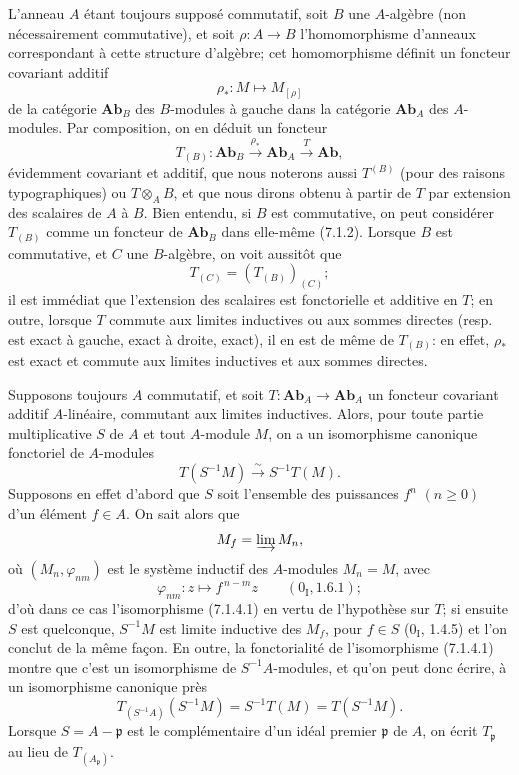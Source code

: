 \begin{env}[7.1.3]
L'anneau $A$ étant toujours supposé commutatif, soit $B$ une $A$-algèbre (non
nécessairement commutative), et soit $\rho:A\to B$ l'homomorphisme d'anneaux
correspondant à cette structure d'algèbre; cet homomorphisme définit un
foncteur covariant
additif
\[
  \rho_*:M\longmapsto M_{[\rho]}
\]
de la catégorie $\mathbf{Ab}_B$ des $B$-modules à gauche dans la catégorie
$\mathbf{Ab}_A$ des $A$-modules. Par composition, on en déduit un foncteur
\[
  T_{(B)}:
  \mathbf{Ab}_B
  \xrightarrow{\rho_*}
  \mathbf{Ab}_A
  \xrightarrow{T}
  \mathbf{Ab},
\]
évidemment covariant et additif, que nous noterons aussi $T^{(B)}$ (pour des
raisons typographiques) ou $T\otimes_A B$, et que nous dirons obtenu à partir
de $T$ par extension des scalaires de $A$ à $B$. Bien entendu, si $B$ est
commutative, on peut considérer $T_{(B)}$ comme un foncteur de
$\mathbf{Ab}_B$ dans elle-même (7.1.2). Lorsque $B$ est commutative, et $C$
une $B$-algèbre, on voit aussitôt que
\[
  T_{(C)}=(T_{(B)})_{(C)};
\]
il est immédiat que l'extension des scalaires est fonctorielle et additive en
$T$; en outre, lorsque $T$ commute aux limites inductives ou aux sommes
directes (resp. est exact à gauche, exact à droite, exact), il en est de même
de $T_{(B)}$: en effet, $\rho_*$ est exact et commute aux limites inductives
et aux sommes directes.
\end{env}

\begin{env}[7.1.4]
Supposons toujours $A$ commutatif, et soit
$T:\mathbf{Ab}_A\to\mathbf{Ab}_A$ un foncteur covariant additif
$A$-linéaire, commutant aux limites inductives. Alors, pour toute partie
multiplicative $S$ de $A$ et tout $A$-module $M$, on a un isomorphisme
canonique fonctoriel de $A$-modules
\[
  T(S^{-1}M)\xrightarrow{\sim}S^{-1}T(M).
  \tag{7.1.4.1}\label{III.7.1.4.1.fr}
\]
Supposons en effet d'abord que $S$ soit l'ensemble des puissances $f^n$
$(n\geqslant0)$ d'un élément $f\in A$. On sait alors que
\[
  M_f=\varinjlim M_n,
\]
où $(M_n,\varphi_{nm})$ est le système inductif des $A$-modules $M_n=M$,
avec
\[
  \varphi_{nm}:z\longmapsto f^{\,n-m}z
  \qquad(0_{\mathrm I}, 1.6.1);
\]
d'où dans ce cas l'isomorphisme (7.1.4.1) en vertu de l'hypothèse sur $T$; si
ensuite $S$ est quelconque, $S^{-1}M$ est limite inductive des $M_f$, pour
$f\in S$ ($0_{\mathrm I}$, 1.4.5) et l'on conclut de la même façon. En outre,
la fonctorialité de l'isomorphisme (7.1.4.1) montre que c'est un isomorphisme
de $S^{-1}A$-modules, et qu'on peut donc écrire, à un isomorphisme canonique
près
\[
  T_{(S^{-1}A)}(S^{-1}M)
  =
  S^{-1}T(M)
  =
  T(S^{-1}M).
  \tag{7.1.4.2}\label{III.7.1.4.2.fr}
\]
Lorsque $S=A-\mathfrak p$ est le complémentaire d'un idéal premier
$\mathfrak p$ de $A$, on écrit $T_{\mathfrak p}$ au lieu de
$T_{(A_{\mathfrak p})}$.
\end{env}

